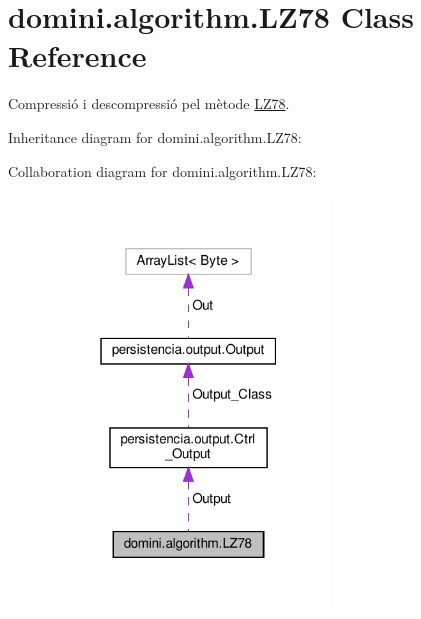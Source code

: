 \hypertarget{classdomini_1_1algorithm_1_1LZ78}{}\section{domini.\+algorithm.\+L\+Z78 Class Reference}
\label{classdomini_1_1algorithm_1_1LZ78}


Compressió i descompressió pel mètode \hyperlink{classdomini_1_1algorithm_1_1LZ78}{L\+Z78}.  




Inheritance diagram for domini.\+algorithm.\+L\+Z78\+:


Collaboration diagram for domini.\+algorithm.\+L\+Z78\+:\nopagebreak
\begin{figure}[H]
\begin{center}
\leavevmode
\includegraphics[width=211pt]{classdomini_1_1algorithm_1_1LZ78__coll__graph}
\end{center}
\end{figure}
